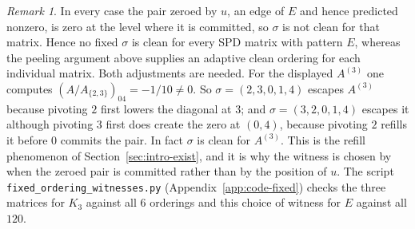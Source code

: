 \documentclass[11pt]{article}
\theoremstyle{plain}
\theoremstyle{definition}
\theoremstyle{remark}
\newtheorem{remark}[theorem]{Remark}
\begin{document}
\begin{humanaiblock}
\begin{remark}
In every case the pair zeroed by $u$, an edge of $E$ and hence predicted nonzero, is zero at the
level where it is committed, so $\sigma$ is not clean for that matrix. Hence no fixed $\sigma$ is
clean for every SPD matrix with pattern $E$, whereas the peeling argument above supplies an adaptive
clean ordering for each individual matrix. Both adjustments are needed. For the displayed $A^{(3)}$
one computes $(A/A_{\{2,3\}})_{04}=-1/10\neq0$. So $\sigma=(2,3,0,1,4)$ escapes $A^{(3)}$ because
pivoting $2$ first lowers the diagonal at $3$; and $\sigma=(3,2,0,1,4)$ escapes it although pivoting
$3$ first does create the zero at $(0,4)$, because pivoting $2$ refills it before $0$ commits the pair.
In fact $\sigma$ is clean for $A^{(3)}$. This is the refill phenomenon of
Section~\ref{sec:intro-exist}, and it is why the witness is chosen by when the zeroed pair is
committed rather than by the position of $u$. The script \texttt{fixed\_ordering\_witnesses.py}
(Appendix~\ref{app:code-fixed}) checks the three matrices for $K_3$ against all $6$ orderings and
this choice of witness for $E$ against all $120$.
\end{remark}
\end{humanaiblock}
\end{document}
